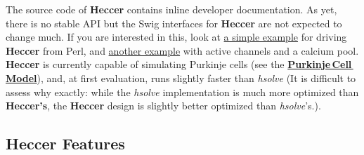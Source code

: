 \documentclass[12pt]{article}
\begin{document}
The source code of {\bf Heccer} contains inline developer documentation. As yet, there is no stable API but the Swig interfaces for {\bf Heccer} are not expected to change much. If you are interested in this, look at \href{http://neurospaces.sourceforge.net/neurospaces_project/heccer/tests/html/glue/swig/perl/fork4p1.source.html#line51}{a simple example} for driving {\bf Heccer} from Perl, and \href{http://neurospaces.sourceforge.net/neurospaces_project/heccer/tests/html/glue/swig/perl/pool1-feedback1.source.html#line51}{another example} with active channels and a calcium pool. {\bf Heccer} is currently capable of simulating Purkinje cells (see the \href{../purkinje-cell-model/purkinje-cell-model.tex}{\bf Purkinje\,Cell\,Model}), and, at first evaluation, runs slightly faster than {\it hsolve} (It is difficult to assess why exactly: while the {\it hsolve} implementation is much more optimized than {\bf Heccer's}, the {\bf Heccer} design is slightly better optimized than {\it hsolve}'s.).

\subsection*{Heccer Features}
\end{document}
